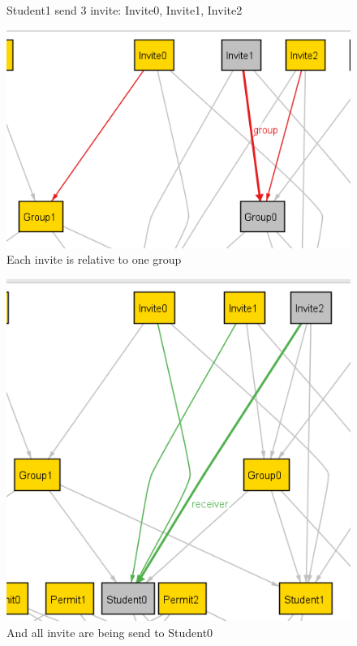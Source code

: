 \documentclass{article}
\begin{document}
{\begin{figure}[H]
    \caption{Student1 send 3 invite: Invite0, Invite1, Invite2}
    \label{fig:sending invite}
\end{figure}
\begin{figure}[H]
    \centering
    \includegraphics{images/ALLOY/group.png}
    \caption{Each invite is relative to one group}
    \label{fig:group invite}
\end{figure}
\begin{figure}[H]
    \centering
    \includegraphics[scale=0.85]{images/ALLOY/receiver.png}
    \caption{And all invite are being send to Student0}
    \label{fig:receiving invite}

\end{figure}}
\end{document}
